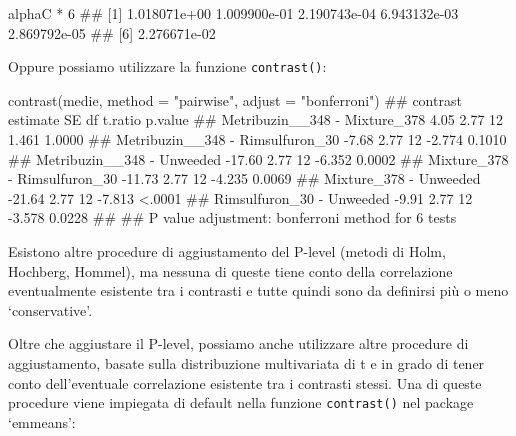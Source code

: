 \documentclass[a4paper,12pt,oneside]{book}
\newenvironment{Shaded}{\begin{snugshade}}{\end{snugshade}}
\newcommand{\DecValTok}[1]{#1}
\newcommand{\SpecialCharTok}[1]{#1}
\newcommand{\StringTok}[1]{#1}
\newcommand{\DocumentationTok}[1]{#1}
\newcommand{\FunctionTok}[1]{#1}
\newcommand{\AttributeTok}[1]{#1}
\newcommand{\NormalTok}[1]{#1}
\begin{document}
\begin{Shaded}
\begin{Highlighting}[]
\NormalTok{alphaC }\SpecialCharTok{*} \DecValTok{6}
\DocumentationTok{\#\# [1] 1.018071e+00 1.009900e{-}01 2.190743e{-}04 6.943132e{-}03 2.869792e{-}05}
\DocumentationTok{\#\# [6] 2.276671e{-}02}
\end{Highlighting}
\end{Shaded}

Oppure possiamo utilizzare la funzione \texttt{contrast()}:

\begin{Shaded}
\begin{Highlighting}[]
\FunctionTok{contrast}\NormalTok{(medie, }\AttributeTok{method =} \StringTok{"pairwise"}\NormalTok{, }\AttributeTok{adjust =} \StringTok{"bonferroni"}\NormalTok{)}
\DocumentationTok{\#\#  contrast                         estimate   SE df t.ratio p.value}
\DocumentationTok{\#\#  Metribuzin\_\_348 {-} Mixture\_378        4.05 2.77 12   1.461  1.0000}
\DocumentationTok{\#\#  Metribuzin\_\_348 {-} Rimsulfuron\_30    {-}7.68 2.77 12  {-}2.774  0.1010}
\DocumentationTok{\#\#  Metribuzin\_\_348 {-} Unweeded         {-}17.60 2.77 12  {-}6.352  0.0002}
\DocumentationTok{\#\#  Mixture\_378 {-} Rimsulfuron\_30       {-}11.73 2.77 12  {-}4.235  0.0069}
\DocumentationTok{\#\#  Mixture\_378 {-} Unweeded             {-}21.64 2.77 12  {-}7.813  \textless{}.0001}
\DocumentationTok{\#\#  Rimsulfuron\_30 {-} Unweeded           {-}9.91 2.77 12  {-}3.578  0.0228}
\DocumentationTok{\#\# }
\DocumentationTok{\#\# P value adjustment: bonferroni method for 6 tests}
\end{Highlighting}
\end{Shaded}

Esistono altre procedure di aggiustamento del P-level (metodi di Holm, Hochberg, Hommel), ma nessuna di queste tiene conto della correlazione eventualmente esistente tra i contrasti e tutte quindi sono da definirsi più o meno `conservative'.

Oltre che aggiustare il P-level, possiamo anche utilizzare altre procedure di aggiustamento, basate sulla distribuzione multivariata di t e in grado di tener conto dell'eventuale correlazione esistente tra i contrasti stessi. Una di queste procedure viene impiegata di default nella funzione \texttt{contrast()} nel package `emmeans':

\small
\end{document}
